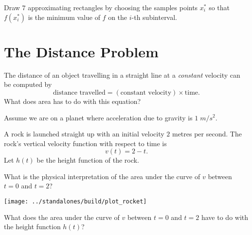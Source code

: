 \documentclass[../main.tex]{subfiles}
\begin{document}
Draw \(7\) approximating rectangles by choosing the samples points \(x_{i}^{*}\) so that \(f(x_{i}^{*})\) is the minimum value of \(f\) on the \(i\)-th subinterval.


\section{The Distance Problem}
The distance of an object travelling in a straight line at a \emph{constant} velocity can be computed by
\[
  \text{distance travelled} = (\text{constant velocity}) \times \text{time}.
\]
\faComments{} What does area has to do with this equation?
\vspace{1in}

\begin{example} \label{example:rock}
Assume we are on a planet where acceleration due to gravity is \(1\;m/s^{2}\). 

A rock is launched straight up with an initial velocity \(2\) metres per second. The rock's vertical velocity function with respect to time is
\[
  v(t) = 2 - t.
\]
Let \(h(t)\) be the height function of the rock. 
\bigskip

\faComments{} What is the physical interpretation of the area under the curve of \(v\) between \(t=0\) and \(t=2\)?

\texttt{[image: ../standalones/build/plot\_rocket]}

\faComments{} What does the area under the curve of \(v\) between \(t=0\) and \(t=2\) have to do with the height function \(h(t)\)? 
\end{example}
\end{document}
